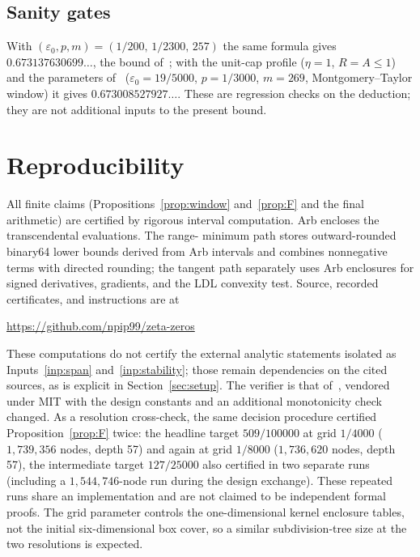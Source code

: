 \documentclass[11pt]{article}
\begin{document}
\subsection{Sanity gates}

With $(\varepsilon_0,p,m)=(1/200,\,1/2300,\,257)$ the same formula gives
$0.673137630699\ldots$, the bound of~\cite{Trmdy26}; with the unit-cap
profile ($\eta=1$, $R=A\le1$) and the parameters of~\cite{Ainta26}
($\varepsilon_0=19/5000$, $p=1/3000$, $m=269$, Montgomery--Taylor window) it
gives $0.673008527927\ldots$.  These are regression checks on the deduction;
they are not additional inputs to the present bound.

\section{Reproducibility}\label{sec:repro}

All finite claims (Propositions~\ref{prop:window} and~\ref{prop:F} and the
final arithmetic) are certified by rigorous interval computation.  Arb
\cite{Johansson17} encloses the transcendental evaluations.  The range-
minimum path stores outward-rounded binary64 lower bounds derived from Arb
intervals and combines nonnegative terms with directed rounding; the tangent
path separately uses Arb enclosures for signed derivatives, gradients, and
the LDL convexity test.  Source,
recorded certificates, and instructions are at
\begin{center}
 \url{https://github.com/npip99/zeta-zeros}
\end{center}
These computations do not certify the external analytic statements isolated
as Inputs~\ref{inp:span} and~\ref{inp:stability}; those remain dependencies on
the cited sources, as is explicit in Section~\ref{sec:setup}.
The verifier is that of~\cite{Trmdy26}, vendored under MIT with the design
constants and an additional monotonicity check changed.  As a resolution
cross-check, the same decision procedure certified Proposition~\ref{prop:F}
twice: the headline target
$509/100000$ at grid $1/4000$ ($1{,}739{,}356$ nodes, depth 57) and again at
grid $1/8000$ ($1{,}736{,}620$ nodes, depth 57), the intermediate target
$127/25000$ also certified in two separate runs (including a
$1{,}544{,}746$-node run during the design exchange).
These repeated runs share an implementation and are not claimed to be
independent formal proofs.  The grid parameter controls the one-dimensional
kernel enclosure tables, not the initial six-dimensional box cover, so a
similar subdivision-tree size at the two resolutions is expected.
\end{document}
